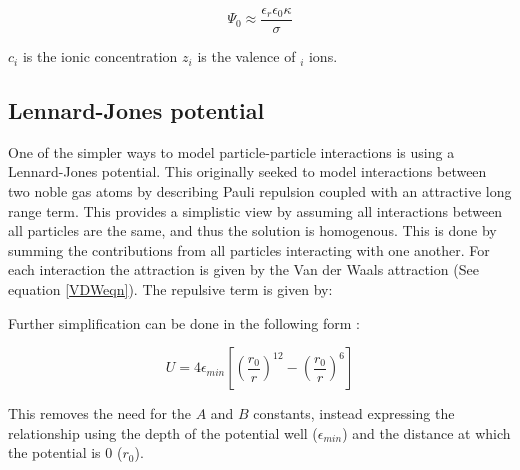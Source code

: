 \begin{equation} %
\Psi_0 \approx \frac{\epsilon_r \epsilon_0 \kappa}{\sigma}
\end{equation}


$c_i$ is the ionic concentration $z_i$ is the valence of $_i$ ions.

\subsection{Lennard-Jones potential} %

One of the simpler ways to model particle-particle interactions is using a Lennard-Jones potential. This originally seeked to model interactions between two noble gas atoms by describing Pauli repulsion coupled with an attractive long range term. This provides a simplistic view by assuming all interactions between all particles are the same, and thus the solution is homogenous. This is done by summing the contributions from all particles interacting with one another. For each interaction the attraction is given by the Van der Waals attraction (See equation \ref{VDWeqn}). The repulsive term is given by:


Further simplification can be done in the following form \cite{lilBlueBook}:

\begin{equation} %
U = 4 \epsilon_{min} \left[\left(\frac{r_0}{r}\right)^{12} - \left(\frac{r_0}{r}\right)^6\right]
\end{equation}



This removes the need for the $A$ and $B$ constants, instead expressing the relationship using the depth of the potential well ($\epsilon_{min}$) and the distance at which the potential is 0 ($r_0$).  

